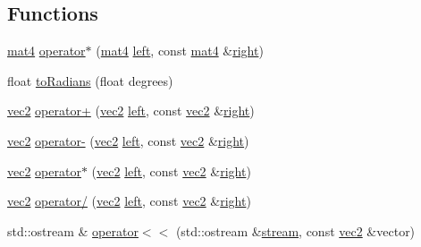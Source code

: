 \subsection*{Functions}
\begin{DoxyCompactItemize}
\item 
\hyperlink{structu__engine_1_1maths_1_1mat4}{mat4} \hyperlink{namespaceu__engine_1_1maths_a8f3bba088d696b29403177fe26e2425d}{operator$\ast$} (\hyperlink{structu__engine_1_1maths_1_1mat4}{mat4} \hyperlink{glew_8h_a6358510bdde486b81c7951ee5c470ee4}{left}, const \hyperlink{structu__engine_1_1maths_1_1mat4}{mat4} \&\hyperlink{glew_8h_a18826d74cd7b4e758c25b4ba66e20be2}{right})
\item 
float \hyperlink{namespaceu__engine_1_1maths_a3f3903fc6e03dbc3aba56774bc675cc1}{to\+Radians} (float degrees)
\item 
\hyperlink{structu__engine_1_1maths_1_1vec2}{vec2} \hyperlink{namespaceu__engine_1_1maths_af706ff2fa7f3159252e89962677b7927}{operator+} (\hyperlink{structu__engine_1_1maths_1_1vec2}{vec2} \hyperlink{glew_8h_a6358510bdde486b81c7951ee5c470ee4}{left}, const \hyperlink{structu__engine_1_1maths_1_1vec2}{vec2} \&\hyperlink{glew_8h_a18826d74cd7b4e758c25b4ba66e20be2}{right})
\item 
\hyperlink{structu__engine_1_1maths_1_1vec2}{vec2} \hyperlink{namespaceu__engine_1_1maths_af0a4764e710da0fc93a4f86e87dcabe7}{operator-\/} (\hyperlink{structu__engine_1_1maths_1_1vec2}{vec2} \hyperlink{glew_8h_a6358510bdde486b81c7951ee5c470ee4}{left}, const \hyperlink{structu__engine_1_1maths_1_1vec2}{vec2} \&\hyperlink{glew_8h_a18826d74cd7b4e758c25b4ba66e20be2}{right})
\item 
\hyperlink{structu__engine_1_1maths_1_1vec2}{vec2} \hyperlink{namespaceu__engine_1_1maths_a5e66adfe6195e1d03ea4242de39db68a}{operator$\ast$} (\hyperlink{structu__engine_1_1maths_1_1vec2}{vec2} \hyperlink{glew_8h_a6358510bdde486b81c7951ee5c470ee4}{left}, const \hyperlink{structu__engine_1_1maths_1_1vec2}{vec2} \&\hyperlink{glew_8h_a18826d74cd7b4e758c25b4ba66e20be2}{right})
\item 
\hyperlink{structu__engine_1_1maths_1_1vec2}{vec2} \hyperlink{namespaceu__engine_1_1maths_a1f7447be74c676613ab8fa948869b231}{operator/} (\hyperlink{structu__engine_1_1maths_1_1vec2}{vec2} \hyperlink{glew_8h_a6358510bdde486b81c7951ee5c470ee4}{left}, const \hyperlink{structu__engine_1_1maths_1_1vec2}{vec2} \&\hyperlink{glew_8h_a18826d74cd7b4e758c25b4ba66e20be2}{right})
\item 
std\+::ostream \& \hyperlink{namespaceu__engine_1_1maths_a326606ab3a13a1fc4c9397fdd2cd0bff}{operator$<$$<$} (std\+::ostream \&\hyperlink{glew_8h_a10d3bc96cdfc1d478f52c13d5ffd9316}{stream}, const \hyperlink{structu__engine_1_1maths_1_1vec2}{vec2} \&vector)

\end{DoxyCompactItemize}
